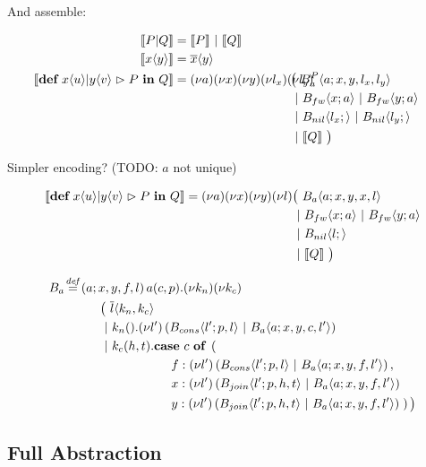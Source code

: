 And assemble:

\begin{align*}
  \encMJtoAP{P \jpar Q}
  &= \encMJtoAP{P} \apar \encMJtoAP{Q}
  \\
  \encMJtoAP{\jsnd{x}{y}}
  &= \asnd{x}{y}
  \\
  \encMJtoAP{\jdef{\jrct{\jrcv{x}{u} \jpat \jrcv{y}{v}}{P}}{Q}}
  &=
  \anew{a}{\anew{x}{\anew{y}{\anew{l_x}{\anew{l_y}{
    \hspace{-1cm}&&\big(\ \ains{B_a^P}{a}{x, y, l_x, l_y} \\ %
    &&&\apar \ains{B_{fw}}{x}{a} \apar \ains{B_{fw}}{y}{a} \\
    &&&\apar \ains{B_{nil}}{l_x}{} \apar \ains{B_{nil}}{l_y}{} \\
    &&&\apar \encMJtoAP{Q}\ \big)
  }}}}}
\end{align*}


Simpler encoding? (TODO: $a$ not unique)

\begin{align*}
  \encMJtoAP{\jdef{\jrct{\jrcv{x}{u} \jpat \jrcv{y}{v}}{P}}{Q}}
  = \anew{a}{\anew{x}{\anew{y}{\anew{l}{
    &\big(\ \ains{B_a}{a}{x, y, x, l} \\
    &\apar \ains{B_{fw}}{x}{a} \apar \ains{B_{fw}}{y}{a} \\
    &\apar \ains{B_{nil}}{l}{} \\
    &\apar \encMJtoAP{Q}
  \ \big)}}}} \\
\end{align*}

\begin{align*}
  \adef*{B_a}{a}{x,y,f,l}{\arcv{a}{c,p} . \anew{k_n}{\anew{k_c}{
  \\ & \hspace{1cm}
    \big(\ \asnd{l}{k_n,k_c}
  \\ & \hspace{1cm}
    \apar \arcv{k_n}{} . \anew{l'}{\parens{\ains{B_{cons}}{l'}{p, l} \apar \ains{B_a}{a}{x, y, c, l'}}}
  \\ & \hspace{1cm}
    \apar \arcv{k_c}{h,t} . \acse{c}{\right.
  \\ & \hspace{3cm}
    \aalt{f}{\anew{l'}{\parens{\ains{B_{cons}}{l'}{p, l} \apar \ains{B_a}{a}{x, y, f, l'}}}},
  \\ & \hspace{3cm}
    \aalt{x}{\anew{l'}{\parens{\ains{B_{join}}{l'}{p, h, t} \apar \ains{B_a}{a}{x, y, f, l'}}}}
  \\ & \hspace{3cm}
    \aalt{y}{\anew{l'}{\parens{\ains{B_{join}}{l'}{p, h, t} \apar \ains{B_a}{a}{x, y, f, l'}}}}
    \left.}\big)
  }}} \\
\end{align*}





\subsection{Full Abstraction}


